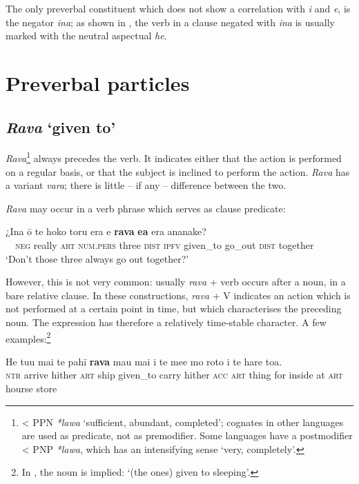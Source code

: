 The only preverbal constituent which does not show a correlation with \textit{i} and \textit{e}, is the negator \textit{{\ꞌ}ina}; as shown in , the verb in a clause negated with \textit{{\ꞌ}ina} is usually marked with the neutral aspectual \textit{he}.
\section{Preverbal particles}\label{sec:7.3}
\subsection{\textit{Rava} ‘given to’}\label{sec:7.3.1}
\textit{Rava}\footnote{\label{fn:340}{\textless} PPN \textit{*lawa} ‘sufficient, abundant, completed’; cognates in other languages are used as predicate, not as premodifier. Some languages have a postmodifier {\textless} PNP \textit{*lawa}, which has an intensifying sense ‘very, completely’.} always precedes the verb. It indicates either that the action is performed on a regular basis, or that the subject is inclined to perform the action. \textit{Rava} has a variant \textit{vara}; there is little – if any – difference between the two.

\textit{Rava} may occur in a verb phrase which serves as clause predicate:

\ea\label{ex:7.85}
\gll ¿{\ꞌ}Ina {\ꞌ}ō te hoko toru era e \textbf{rava} \textbf{e{\ꞌ}a} era ananake? \\
~~\textsc{neg} really \textsc{art} \textsc{num.pers} three \textsc{dist} \textsc{ipfv} given\_to go\_out \textsc{dist} together \\

\glt
‘Don’t those three always go out together?’ \textstyleExampleref{[R366.044]} 
\z

However, this is not very common: usually \textit{rava} + verb occurs after a noun, in a bare relative clause. In these constructions, \textit{rava} + V indicates an action which is not performed at a certain point in time, but which characterises the preceding noun. The expression has therefore a relatively time-stable character. A few examples:\footnote{\label{fn:341}In , the noun is implied: ‘(the ones) given to sleeping’.}

\ea\label{ex:7.86}
\gll He tu{\ꞌ}u mai te pahī \textbf{rava} ma{\ꞌ}u mai i te me{\ꞌ}e mo roto  i te hare toa.\\
\textsc{ntr} arrive hither \textsc{art} ship given\_to carry hither \textsc{acc} \textsc{art} thing for inside  at \textsc{art} hourse store\\

